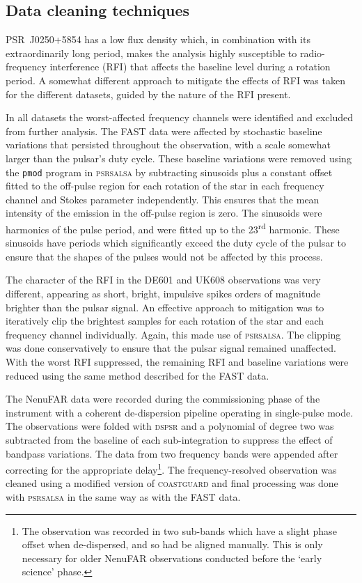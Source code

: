 \subsection{Data cleaning techniques}
\label{sec: J0250 - observations - cleaning}

PSR~J0250+5854 has a low flux density which, in combination with its extraordinarily long period, makes the analysis highly susceptible to radio-frequency interference (RFI) that affects the baseline level during a rotation period. A somewhat different approach to mitigate the effects of RFI was taken for the different datasets, guided by the nature of the RFI present.

In all datasets the worst-affected frequency channels were identified and excluded from further analysis. The FAST data were affected by stochastic baseline variations that persisted throughout the observation, with a scale somewhat larger than the pulsar's duty cycle. These baseline variations were removed using the \texttt{pmod} program in \textsc{psrsalsa} by subtracting sinusoids plus a constant offset fitted to the off-pulse region for each rotation of the star in each frequency channel and Stokes parameter independently. This ensures that the mean intensity of the emission in the off-pulse region is zero. The sinusoids were harmonics of the pulse period, and were fitted up to the 23\textsuperscript{rd} harmonic. These sinusoids have periods which significantly exceed the duty cycle of the pulsar to ensure that the shapes of the pulses would not be affected by this process.

The character of the RFI in the DE601 and UK608 observations was very different, appearing as short, bright, impulsive spikes orders of magnitude brighter than the pulsar signal. An effective approach to mitigation was to iteratively clip the brightest samples for each rotation of the star and each frequency channel individually. Again, this made use of \textsc{psrsalsa}. The clipping was done conservatively to ensure that the pulsar signal remained unaffected. With the worst RFI suppressed, the remaining RFI and baseline variations were reduced using the same method described for the FAST data.

The NenuFAR data were recorded during the commissioning phase of the instrument with a coherent de-dispersion pipeline \citep[LUPPI;][]{BGT+2020} operating in single-pulse mode. The observations were folded with \textsc{dspsr} and a polynomial of degree two was subtracted from the baseline of each sub-integration to suppress the effect of bandpass variations. The data from two frequency bands were appended after correcting for the appropriate delay\footnote{The observation was recorded in two sub-bands which have a slight phase offset when de-dispersed, and so had be aligned manually. This is only necessary for older NenuFAR observations conducted before the `early science' phase.}. The frequency-resolved observation was cleaned using a modified version of \textsc{coastguard} \citep{LKG+2016} and final processing was done with \textsc{psrsalsa} in the same way as with the FAST data.



